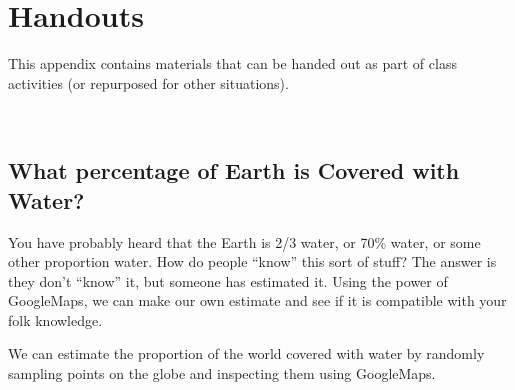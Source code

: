 


\chapter{Handouts}









This appendix contains materials that can be handed out as part of class activities (or repurposed
for other situations).

\newpage

\ 

\newpage

\section{What percentage of Earth is Covered with Water?}
\label{sec:googleMap}
You have probably heard that the Earth is 2/3 water, or 70\% water, or some other proportion
water.  How do people ``know'' this sort of stuff?  The answer is they don't ``know'' it, but
someone has estimated it.  Using the power of GoogleMaps, we can make our own estimate and see
if it is compatible with your folk knowledge.

We can estimate the proportion of the world covered with water by randomly 
sampling points on the globe and inspecting them using GoogleMaps.


